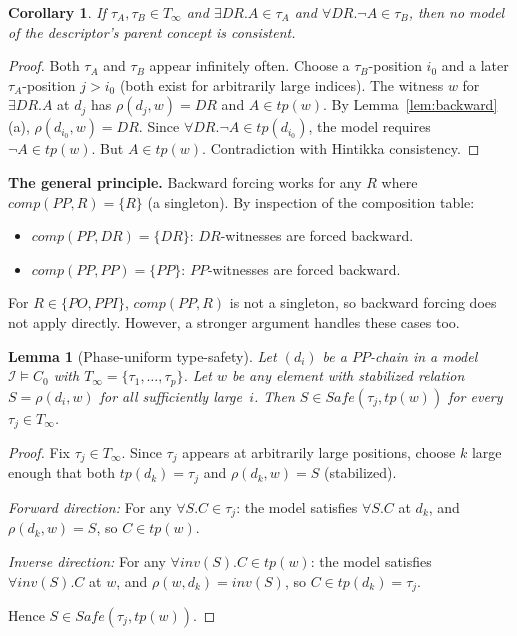 \documentclass[11pt]{article}
\newcommand{\interp}{\mathcal{I}}
\newcommand{\DR}{\mathit{DR}}
\newcommand{\PO}{\mathit{PO}}
\newcommand{\PP}{\mathit{PP}}
\newcommand{\PPI}{\mathit{PPI}}
\newcommand{\comp}{\mathit{comp}}
\newcommand{\tp}{\mathit{tp}}
\newcommand{\Safe}{\mathit{Safe}}
\newcommand{\inv}{\mathit{inv}}
\newtheorem{lemma}[theorem]{Lemma}
\newtheorem{corollary}[theorem]{Corollary}
\theoremstyle{definition}
\begin{document}
\begin{corollary}
\label{cor:impossible}
If $\tau_A, \tau_B \in T_\infty$ and $\exists\DR.A \in \tau_A$
and $\forall\DR.\neg A \in \tau_B$, then no model of the
descriptor's parent concept is consistent.
\end{corollary}

\begin{proof}
Both $\tau_A$ and $\tau_B$ appear infinitely often.  Choose a
$\tau_B$-position $i_0$ and a later $\tau_A$-position $j > i_0$
(both exist for arbitrarily large indices).  The witness $w$
for $\exists\DR.A$ at $d_j$ has $\rho(d_j, w) = \DR$ and
$A \in \tp(w)$.  By Lemma~\ref{lem:backward}(a),
$\rho(d_{i_0}, w) = \DR$.  Since
$\forall\DR.\neg A \in \tp(d_{i_0})$, the model requires
$\neg A \in \tp(w)$.  But $A \in \tp(w)$.  Contradiction with
Hintikka consistency.
\end{proof}

\noindent\textbf{The general principle.}\;
Backward forcing works for any $R$ where $\comp(\PP, R) = \{R\}$
(a singleton).  By inspection of the composition table:
\begin{itemize}
\item $\comp(\PP, \DR) = \{\DR\}$: $\DR$-witnesses are forced
  backward.
\item $\comp(\PP, \PP) = \{\PP\}$: $\PP$-witnesses are forced
  backward.
\end{itemize}
For $R \in \{\PO, \PPI\}$, $\comp(\PP, R)$ is not a singleton,
so backward forcing does not apply directly.  However, a
stronger argument handles these cases too.

\begin{lemma}[Phase-uniform type-safety]
\label{lem:phase-uniform}
Let $(d_i)$ be a $\PP$-chain in a model $\interp \models C_0$
with $T_\infty = \{\tau_1, \ldots, \tau_p\}$.  Let $w$ be any
element with stabilized relation $S = \rho(d_i, w)$ for all
sufficiently large~$i$.  Then
$S \in \Safe(\tau_j, \tp(w))$ for every $\tau_j \in T_\infty$.
\end{lemma}

\begin{proof}
Fix $\tau_j \in T_\infty$.  Since $\tau_j$ appears at
arbitrarily large positions, choose $k$ large enough that both
$\tp(d_k) = \tau_j$ and $\rho(d_k, w) = S$ (stabilized).

\emph{Forward direction:}\; For any $\forall S.C \in \tau_j$:
the model satisfies $\forall S.C$ at $d_k$, and
$\rho(d_k, w) = S$, so $C \in \tp(w)$.

\emph{Inverse direction:}\; For any $\forall\inv(S).C \in \tp(w)$:
the model satisfies $\forall\inv(S).C$ at $w$, and
$\rho(w, d_k) = \inv(S)$, so $C \in \tp(d_k) = \tau_j$.

Hence $S \in \Safe(\tau_j, \tp(w))$.
\end{proof}
\end{document}
